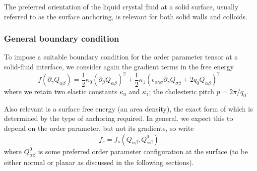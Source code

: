 \label{section-lc-anchoring}

The preferred orientation of the liquid crystal fluid at a solid surface,
usually referred to as the surface anchoring, is relevant for both
solid walls and colloids.

\subsubsection{General boundary condition}

To impose a suitable boundary condition for the order parameter tensor
at a solid-fluid interface, we consider again the gradient terms in
the free energy
\begin{equation}
f (\partial_\gamma Q_{\alpha\beta}) = 
{\textstyle\frac{1}{2}} \kappa_0 (\partial_\beta Q_{\alpha\beta})^2
+ {\textstyle\frac{1}{2}}
 \kappa_1 (\epsilon_{\alpha\gamma\sigma} \partial_\gamma
Q_{\sigma\beta} + 2q_0 Q_{\alpha\beta})^2
\end{equation}
where we retain
two elastic constants $\kappa_0$ and $\kappa_1$;
the cholesteric pitch $p = 2\pi/q_0$.

Also relevant is a surface free energy (an area density), the exact form
of which is determined by the type of anchoring required. In general, we
expect this to depend on the order parameter, but not its gradients, so
write
\begin{equation}
f_s = f_s (Q_{\alpha\beta}, Q^0_{\alpha\beta})
\end{equation}
where $Q^0_{\alpha\beta}$ is some preferred order parameter configuration
at the surface (to be either normal or planar as discussed in the following
sections).

